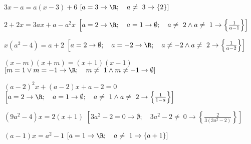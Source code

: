 \begin{esercizio}[*]
\begin{enumeratea}
% 
 \item \(3x-a=a(x-3)+6\)
\hfill \(\left[a=3 \rightarrow \R; \quad a\neq~3 \rightarrow \{2\}\right]\)
 \item \(2+2x=3ax+a-a^{2}x\)
\hfill \(\left[a=2 \rightarrow \R; \quad 
a=1 \rightarrow \emptyset; \quad 
a\neq~2\wedge a\neq~1 \rightarrow \left\{\frac{1}{a-1}\right\}\right]\)
 \item \(x(a^{2}-4)=a+2\)
\hfill \(\left[a=2 \rightarrow \emptyset; \quad 
a=-2 \rightarrow \R; \quad 
a\neq -2\wedge a\neq~2 \rightarrow \left\{\frac{1}{a-2}\right\}\right]\)
 \item \((x-m)(x+m)=(x+1)(x-1)\)
\hfill \(\left[m=1\vee m=-1 \rightarrow \R; \quad 
m\neq~1\wedge m\neq -1 \rightarrow \emptyset\right]\)
 \item \((a-2)^{2}x+(a-2)x+a-2=0\)
\hfill \(\left[a=2 \rightarrow \R; \quad 
a=1 \rightarrow \emptyset; \quad 
a\neq~1\wedge a\neq~2 \rightarrow \left\{\frac{1}{1-a}\right\}\right]\)
 \item \(\left(9a^{2}-4\right)x=2(x+1)\)
\hfill \(\left[3a^{2}-2=0 \rightarrow \emptyset; \quad 
3a^{2}-2\neq~0 \rightarrow \left\{\frac{2}{3(3a^{2}-2)}\right\}\right]\)
 \item \((a-1)x=a^{2}-1\)
\hfill \(\left[a=1 \rightarrow \R; \quad 
a\neq~1 \rightarrow \{a+1\}\right]\)

\end{enumeratea}
\end{esercizio}
